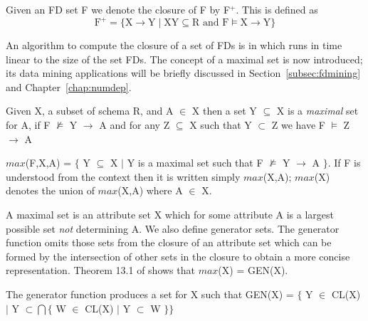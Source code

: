 \medskip
{}
\begin{definition}
\begin{rm}
Given an FD set F we denote the closure of F by F$^+$. 
This is defined as
\begin{displaymath}
\mbox{F}^+ = \{\mbox{X} \to \mbox{Y} \mid \mbox{XY} \subseteq \mbox{R}
\mbox{ and } \mbox{F} \models \mbox{X}
\to \mbox{Y}  \}
\end{displaymath}
\end{rm}
\end{definition}


An algorithm to compute the closure of a set of FDs is in 
\cite{databasefound,atze93} which runs in time linear to the size of
the set FDs. The
concept of a maximal set is now introduced; its data mining
applications will be briefly discussed in
Section~\ref{subsec:fdmining} and Chapter~\ref{chap:numdep}.
\begin{definition}
\begin{rm}
Given X, a subset of schema R, and A $\in$ X then
a set Y $\subseteq$ X is a {\em maximal} set for A, if F
$\not\models$ Y $\to$ A and for any
Z $\subseteq$ X such that Y $\subset$ Z we have F $\models$ Z $\to$ A
\end{rm}
\end{definition}

\begin{definition}
\begin{rm}
$max$(F,X,A) = $\{$ Y $\subseteq$ X $\mid$ Y is a maximal set such that
F $\not\models$ Y $\to$ A $\}$.  If F is understood from the context then it
is written simply $max$(X,A); $max$(X) denotes the union of $max$(X,A)
where A $\in$ X.
\end{rm}
\end{definition}


A maximal set is an attribute set X which for some attribute A is
a largest possible set {\em not} determining A. We also define
generator sets. The generator function omits those sets from the
closure of an attribute set which can be formed by the intersection of
other sets in the closure to obtain a more concise
representation. Theorem 13.1 of \cite{Mann92} shows that $max$(X) = GEN(X).
\begin{definition}
\begin{rm}
The generator function produces a set for X such that
GEN(X) = $\{$ Y $\in$ CL(X) $\mid$ Y $\subset \bigcap \{$ W $\in$
CL(X) $\mid$ Y $\subset$ W $\}\}$
\end{rm}
\end{definition}

